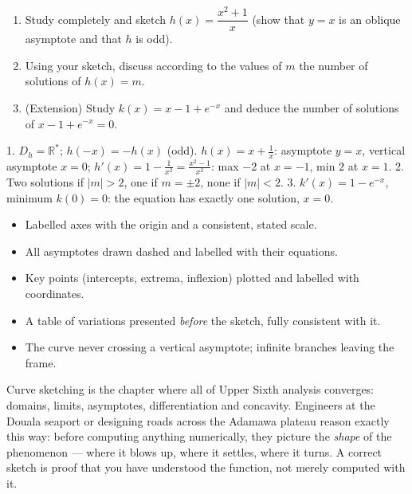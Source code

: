 \documentclass[11pt]{article}
\begin{document}
\begin{exercice}[Practice]
\begin{enumerate}
\item Study completely and sketch $h(x)=\dfrac{x^2+1}{x}$ (show that $y=x$ is an oblique asymptote and that $h$ is odd).
\item Using your sketch, discuss according to the values of $m$ the number of solutions of $h(x)=m$.
\item (Extension) Study $k(x)=x-1+e^{-x}$ and deduce the number of solutions of $x-1+e^{-x}=0$.
\end{enumerate}
\end{exercice}

\begin{corrige}
1. $D_h=\mathbb{R}^*$; $h(-x)=-h(x)$ (odd). $h(x)=x+\frac1x$: asymptote $y=x$, vertical asymptote $x=0$; $h'(x)=1-\frac{1}{x^2}=\frac{x^2-1}{x^2}$: max $-2$ at $x=-1$, min $2$ at $x=1$. 
2. Two solutions if $|m|>2$, one if $m=\pm2$, none if $|m|<2$. 
3. $k'(x)=1-e^{-x}$, minimum $k(0)=0$: the equation has exactly one solution, $x=0$.
\end{corrige}

\begin{aretenir}
\begin{itemize}
\item Labelled axes with the origin and a consistent, stated scale.
\item All asymptotes drawn dashed and labelled with their equations.
\item Key points (intercepts, extrema, inflexion) plotted and labelled with coordinates.
\item A table of variations presented \emph{before} the sketch, fully consistent with it.
\item The curve never crossing a vertical asymptote; infinite branches leaving the frame.
\end{itemize}
\end{aretenir}

\begin{savaistu}
Curve sketching is the chapter where all of Upper Sixth analysis converges: domains, limits, asymptotes, differentiation and concavity. Engineers at the Douala seaport or designing roads across the Adamawa plateau reason exactly this way: before computing anything numerically, they picture the \emph{shape} of the phenomenon — where it blows up, where it settles, where it turns. A correct sketch is proof that you have understood the function, not merely computed with it.
\end{savaistu}
\end{document}
